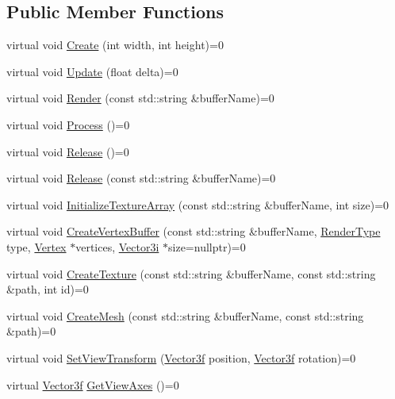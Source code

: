 \subsection*{Public Member Functions}
\begin{DoxyCompactItemize}
\item 
virtual void \mbox{\hyperlink{classse_1_1_abstract_renderer_a3b0c7d8dc34c56513b3160e2cf1e094a}{Create}} (int width, int height)=0
\item 
virtual void \mbox{\hyperlink{classse_1_1_abstract_renderer_aae49e7417663d6a5aca34a2bb37b4b28}{Update}} (float delta)=0
\item 
virtual void \mbox{\hyperlink{classse_1_1_abstract_renderer_a76058a91574874ab3c51294a2c9ea85c}{Render}} (const std\+::string \&buffer\+Name)=0
\item 
virtual void \mbox{\hyperlink{classse_1_1_abstract_renderer_a90596b2d067b4fa197b809191407be97}{Process}} ()=0
\item 
virtual void \mbox{\hyperlink{classse_1_1_abstract_renderer_a98e35b7db62827580573185ed91b25bb}{Release}} ()=0
\item 
virtual void \mbox{\hyperlink{classse_1_1_abstract_renderer_af6d6d012f070f95d4c49713002872fcc}{Release}} (const std\+::string \&buffer\+Name)=0
\item 
virtual void \mbox{\hyperlink{classse_1_1_abstract_renderer_afd7697df1d4958ec3b0fa13109a269a1}{Initialize\+Texture\+Array}} (const std\+::string \&buffer\+Name, int size)=0
\item 
virtual void \mbox{\hyperlink{classse_1_1_abstract_renderer_a953d57d04771acae78c3725bee3639d4}{Create\+Vertex\+Buffer}} (const std\+::string \&buffer\+Name, \mbox{\hyperlink{namespacese_a9ed62241331cac830c5c1ba8450afc2b}{Render\+Type}} type, \mbox{\hyperlink{structse_1_1_vertex}{Vertex}} $\ast$vertices, \mbox{\hyperlink{namespacese_ada11715de7cf6e87b5dfb4611fe68d29}{Vector3i}} $\ast$size=nullptr)=0
\item 
virtual void \mbox{\hyperlink{classse_1_1_abstract_renderer_a89f2efd2ee68cfb6735e51ce87206dfd}{Create\+Texture}} (const std\+::string \&buffer\+Name, const std\+::string \&path, int id)=0
\item 
virtual void \mbox{\hyperlink{classse_1_1_abstract_renderer_a4a3e8836f7a8b1b35a5f7cb1b4231476}{Create\+Mesh}} (const std\+::string \&buffer\+Name, const std\+::string \&path)=0
\item 
virtual void \mbox{\hyperlink{classse_1_1_abstract_renderer_a710e67232e977fbb3b74f79640e0b62e}{Set\+View\+Transform}} (\mbox{\hyperlink{namespacese_a12e07512d95e2fdebdaf74a5ea2cf5f6}{Vector3f}} position, \mbox{\hyperlink{namespacese_a12e07512d95e2fdebdaf74a5ea2cf5f6}{Vector3f}} rotation)=0
\item 
virtual \mbox{\hyperlink{namespacese_a12e07512d95e2fdebdaf74a5ea2cf5f6}{Vector3f}} \mbox{\hyperlink{classse_1_1_abstract_renderer_a8af4c1bef5cf120f6160f5d93dd74207}{Get\+View\+Axes}} ()=0
\end{DoxyCompactItemize}


